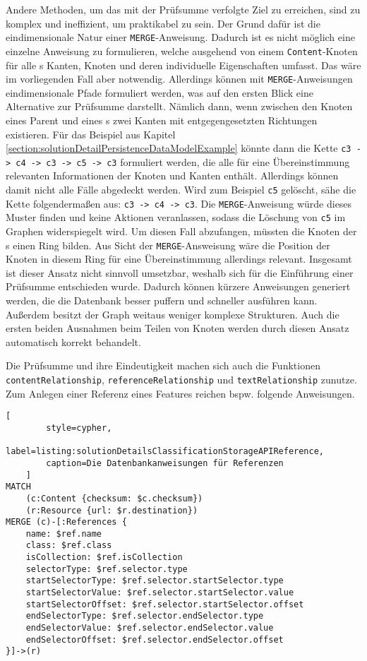     Andere Methoden, um das mit der Prüfsumme verfolgte Ziel zu erreichen,
    sind zu komplex und ineffizient, um praktikabel zu sein.
    Der Grund dafür ist die eindimensionale Natur einer \texttt{MERGE}-Anweisung.
    Dadurch ist es nicht möglich eine einzelne Anweisung zu formulieren,
    welche ausgehend von einem \texttt{Content}-Knoten für alle {\childFeature}s
    Kanten, Knoten und deren individuelle Eigenschaften umfasst.
    Das wäre im vorliegenden Fall aber notwendig.
    Allerdings können mit \texttt{MERGE}-Anweisungen eindimensionale Pfade formuliert werden,
    was auf den ersten Blick eine Alternative zur Prüfsumme darstellt.
    Nämlich dann, wenn zwischen den Knoten eines Parent und eines {\childFeature}s
    zwei Kanten mit entgegengesetzten Richtungen existieren.
    Für das Beispiel aus Kapitel \ref{section:solutionDetailPersistenceDataModelExample} könnte dann
    die Kette \texttt{c3 -> c4 -> c3 -> c5 -> c3} formuliert werden,
    die alle für eine Übereinstimmung relevanten Informationen der Knoten und Kanten enthält.
    Allerdings können damit nicht alle Fälle abgedeckt werden.
    Wird zum Beispiel \texttt{c5} gelöscht, sähe die Kette folgendermaßen aus:
    \texttt{c3 -> c4 -> c3}.
    Die \texttt{MERGE}-Anweisung würde dieses Muster finden und keine Aktionen veranlassen,
    sodass die Löschung von \texttt{c5} im Graphen widerspiegelt wird.
    Um diesen Fall abzufangen, müssten die Knoten der {\childFeature}s einen Ring bilden.
    Aus Sicht der \texttt{MERGE}-Answeisung wäre die Position der Knoten in diesem Ring
    für eine Übereinstimmung allerdings relevant.
    Insgesamt ist dieser Ansatz nicht sinnvoll umsetzbar,
    weshalb sich für die Einführung einer Prüfsumme entschieden wurde.
    Dadurch können kürzere Anweisungen generiert werden, die die Datenbank besser puffern
    und schneller ausführen kann.
    Außerdem besitzt der Graph weitaus weniger komplexe Strukturen.
    Auch die ersten beiden Ausnahmen beim Teilen von Knoten werden durch diesen Ansatz
    automatisch korrekt behandelt.

    Die Prüfsumme und ihre Eindeutigkeit machen sich auch die Funktionen
    \texttt{contentRelationship}, \texttt{referenceRelationship} und \texttt{textRelationship} zunutze.
    Zum Anlegen einer Referenz eines Features reichen bspw. folgende Anweisungen.

\begin{lstlisting}[
        style=cypher,
        label=listing:solutionDetailsClassificationStorageAPIReference,
        caption=Die Datenbankanweisungen für Referenzen
    ]
MATCH
    (c:Content {checksum: $c.checksum})
    (r:Resource {url: $r.destination})
MERGE (c)-[:References {
    name: $ref.name
    class: $ref.class
    isCollection: $ref.isCollection
    selectorType: $ref.selector.type
    startSelectorType: $ref.selector.startSelector.type
    startSelectorValue: $ref.selector.startSelector.value
    startSelectorOffset: $ref.selector.startSelector.offset
    endSelectorType: $ref.selector.endSelector.type
    endSelectorValue: $ref.selector.endSelector.value
    endSelectorOffset: $ref.selector.endSelector.offset
}]->(r)
    \end{lstlisting}

